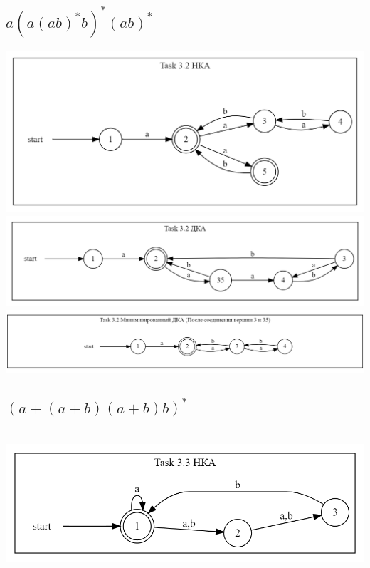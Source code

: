 \documentclass{article}
\begin{document}
\subsection{$a(a(ab)^* b)^* (ab)^*$}
\newline\includegraphics[scale=0.4]{3_2_1.png}
\newline\includegraphics[scale=0.4]{3_2_2.png}
\newline\includegraphics[scale=0.4]{3_2_3.png}
 
\subsection{$ (a + (a + b)(a + b)b)^*$}\\ 
\newline\includegraphics[scale=0.4]{3_3_1.png}
\end{document}
